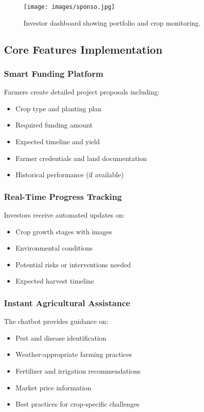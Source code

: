 \documentclass[9pt,twocolumn,twoside]{article}
\begin{document}
\begin{figure}[H]
\centering
\texttt{[image: images/sponso.jpg]}
\caption{Investor dashboard showing portfolio and crop monitoring.}
\label{fig:investor_ui}
\end{figure}

\subsection{Core Features Implementation}

\subsubsection{Smart Funding Platform}

Farmers create detailed project proposals including:
\begin{itemize}
  \item Crop type and planting plan
  \item Required funding amount
  \item Expected timeline and yield
  \item Farmer credentials and land documentation
  \item Historical performance (if available)
\end{itemize}

\subsubsection{Real-Time Progress Tracking}

Investors receive automated updates on:
\begin{itemize}
  \item Crop growth stages with images
  \item Environmental conditions
  \item Potential risks or interventions needed
  \item Expected harvest timeline
\end{itemize}

\subsubsection{Instant Agricultural Assistance}

The chatbot provides guidance on:
\begin{itemize}
  \item Pest and disease identification
  \item Weather-appropriate farming practices
  \item Fertilizer and irrigation recommendations
  \item Market price information
  \item Best practices for crop-specific challenges
\end{itemize}
\end{document}
